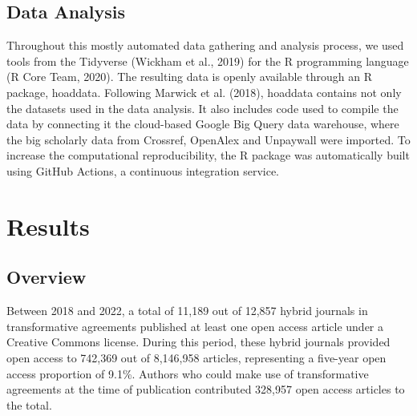 \documentclass[a4paper,man,floatsintext,longtable,noextraspace,12pt]{apa6}
\begin{document}
\hypertarget{data-analysis}{%
\subsection{Data Analysis}\label{data-analysis}}

Throughout this mostly automated data gathering and analysis process, we
used tools from the Tidyverse (Wickham et al., 2019) for the R
programming language (R Core Team, 2020). The resulting data is openly
available through an R package, hoaddata. Following Marwick et al.
(2018), hoaddata contains not only the datasets used in the data
analysis. It also includes code used to compile the data by connecting
it the cloud-based Google Big Query data warehouse, where the big
scholarly data from Crossref, OpenAlex and Unpaywall were imported. To
increase the computational reproducibility, the R package was
automatically built using GitHub Actions, a continuous integration
service.

\hypertarget{results}{%
\section{Results}\label{results}}

\hypertarget{overview}{%
\subsection{Overview}\label{overview}}

Between 2018 and 2022, a total of 11,189 out of 12,857 hybrid journals
in transformative agreements published at least one open access article
under a Creative Commons license. During this period, these hybrid
journals provided open access to 742,369 out of 8,146,958 articles,
representing a five-year open access proportion of 9.1\%. Authors who
could make use of transformative agreements at the time of publication
contributed 328,957 open access articles to the total.
\end{document}
